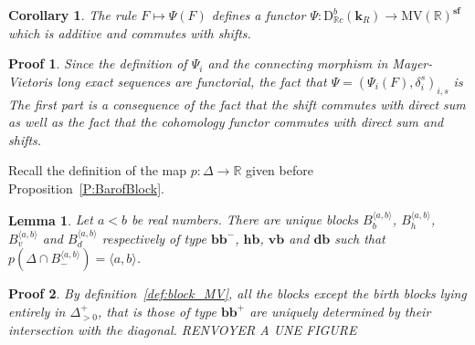 \documentclass[a4paper, english, 11pt]{article}
\newcommand{\kk}[0]{\textbf{k}}
\newcommand{\0}{\vec{0}}
\newcommand{\R}[0]{\mathbb{R}}
\newcommand{\D}[0]{\text{D}}
\newcommand{\MV}{\text{MV}}
\newcommand{\s}{\textbf{sf}}
\newtheorem*{pf}{Proof} }
\newtheorem{cor}[prop]{Corollary}
\newtheorem{lem}[prop]{Lemma}
\begin{document}
\begin{cor}\label{P:PropertiesofPsi}
The rule $F\mapsto \Psi(F)$ defines a functor $\Psi: \D^b_{\R c}(\kk_R)\to \MV(\R)^\s$ 
which is additive and commutes with shifts.
\end{cor}
\begin{pf} Since the definition of $\Psi_i$ and the connecting morphism in Mayer-Vietoris long exact sequences are functorial, the fact that $\Psi= (\Psi_i(F), \delta^s_i)_{i,s}$ is 
The first part is a consequence of the fact that the shift commutes with direct sum as well as the fact that the cohomology functor commutes with direct sum and shifts. 
\end{pf}
Recall the definition of the map $p: \Delta\to \R$ given before Proposition~\ref{P:BarofBlock}.
\begin{lem}\label{L:Blockassociatedtointerval}
 Let  $a<b$ be real numbers. There are unique  blocks $B_{b}^{\langle a, b\rangle}$, $B_{h}^{\langle a, b\rangle}$, $B_{v}^{\langle a, b\rangle}$ and $B_{d}^{\langle a, b\rangle}$ respectively of type $\textbf{bb}^{-}$, $\textbf{hb}$, $\textbf{vb}$ and $\textbf{db}$ such that $p(\Delta\cap B_{-}^{\langle a, b\rangle}) = \langle a,b \rangle$. 
\end{lem}
\begin{pf}
By definition~\ref{def:block_MV}, all the blocks except the birth blocks lying entirely in $\Delta^+_{>0}$, that is those of type $\textbf{bb}^{+}$  are uniquely determined by their intersection with the diagonal. RENVOYER A UNE FIGURE
\end{pf}
\end{document}
